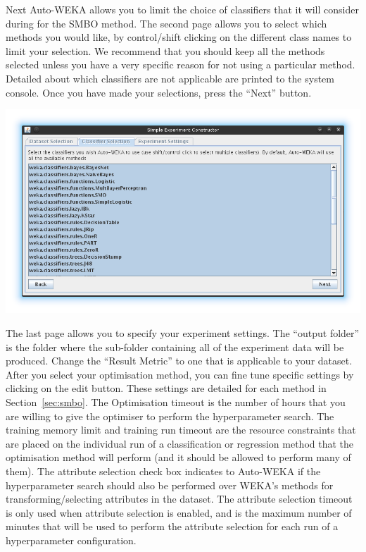 Next Auto-WEKA allows you to limit the choice of classifiers that it will consider during for the SMBO method. The second page allows you to select which methods you would like, by control/shift clicking on the different class names to limit your selection. We recommend that you should keep all the methods selected unless you have a very specific reason for not using a particular method. Detailed about which classifiers are not applicable are printed to the system console. Once you have made your selections,  press the ``Next'' button.

\begin{center}
  \includegraphics[scale=0.7]{guiscreens/builder-classifier.png}
\end{center}

The last page allows you to specify your experiment settings. The ``output folder'' is the folder where the sub-folder containing all of the experiment data will be produced. Change the ``Result Metric'' to one that is applicable to your dataset. After you select your optimisation method, you can fine tune specific settings by clicking on the edit button. These settings are detailed for each  method in Section~\ref{sec:smbo}. The Optimisation timeout is the number of hours that you are willing to give the optimiser to perform the hyperparameter search. The training memory limit and training run timeout are the resource constraints that are placed on the individual run of a classification or regression method that the optimisation method will perform (and it should be allowed to perform many of them). The attribute selection check box indicates to Auto-WEKA if the hyperparameter search should also be performed over WEKA's methods for transforming/selecting attributes in the dataset. The attribute selection timeout is only used when attribute selection is enabled, and is the maximum number of minutes that will be used to perform the attribute selection for each run of a hyperparameter configuration.

